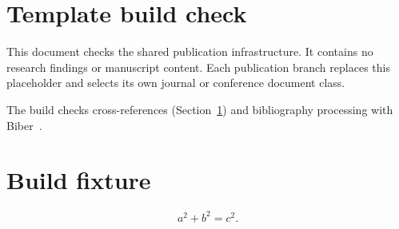 \section*{Template build check}
This document checks the shared publication infrastructure. It contains no
research findings or manuscript content. Each publication branch replaces this
placeholder and selects its own journal or conference document class.

The build checks cross-references (Section~\ref{sec:check}) and bibliography
processing with Biber~\parencite{latex-project}.

\section{Build fixture}\label{sec:check}
\begin{equation}
  a^2+b^2=c^2.
\end{equation}
